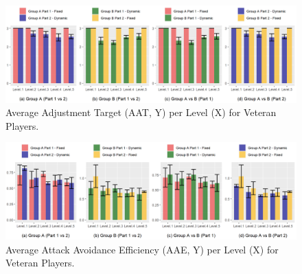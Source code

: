 

\begin{figure}[!ht]
    \caption{Average Adjustment Target (AAT, Y) per Level (X) for Veteran Players.}
    \begin{center}
        \includegraphics[width=34em]{figures/adjustment_target_level-veteran_players.png}
    \end{center}
    \label{fig:result-metric-veteran-adjustment-target-level}
\end{figure}

\begin{figure}[!ht]
    \caption{Average Attack Avoidance Efficiency (AAE, Y) per Level (X) for Veteran Players.}
    \begin{center}
        \includegraphics[width=34em]{figures/attack_avoidance_efficiency-veteran_players.png}
    \end{center}
    \label{fig:result-metric-veterans-attack-avoidance-efficiency}
\end{figure}

